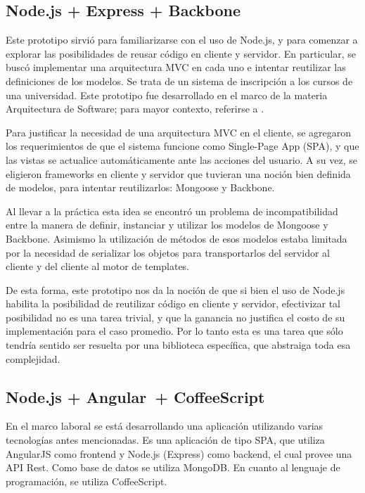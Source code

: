 \documentclass[doc,helv,longtable]{article}
\begin{document}
\subsection{Node.js + Express + Backbone}
Este prototipo\cite{arqrepo} sirvió para familiarizarse con el uso de Node.js, y para comenzar a explorar las posibilidades de reusar código en cliente y servidor. En particular, se buscó implementar una arquitectura MVC en cada uno e intentar reutilizar las definiciones de los modelos. Se trata de un sistema de inscripción a los cursos de una universidad. Este prototipo fue desarrollado en el marco de la materia Arquitectura de Software; para mayor contexto, referirse a \cite{arqdoc}.

Para justificar la necesidad de una arquitectura MVC en el cliente, se agregaron los requerimientos de que el sistema funcione como Single-Page App (SPA)\cite{spa}, y que las vistas se actualice automáticamente ante las acciones del usuario. A su vez, se eligieron frameworks en cliente y servidor que tuvieran una noción bien definida de modelos, para intentar reutilizarlos: Mongoose\cite{mongoose} y Backbone.

Al llevar a la práctica esta idea se encontró un problema de incompatibilidad entre la manera de definir, instanciar y utilizar los modelos de Mongoose y Backbone. Asimismo la utilización de métodos de esos modelos estaba limitada por la necesidad de serializar los objetos para transportarlos del servidor al cliente y del cliente al motor de templates.

De esta forma, este prototipo nos da la noción de que si bien el uso de Node.js habilita la posibilidad de reutilizar código en cliente y servidor, efectivizar tal posibilidad no es una tarea trivial, y que la ganancia no justifica el costo de su implementación para el caso promedio. Por lo tanto esta es una tarea que sólo tendría sentido ser resuelta por una biblioteca específica, que abstraiga toda esa complejidad.

\subsection{Node.js + Angular + CoffeeScript}
En el marco laboral se está desarrollando una aplicación\cite{acekia} utilizando varias tecnologías antes mencionadas. Es una aplicación de tipo SPA\cite{spa}, que utiliza AngularJS como frontend y Node.js (Express) como backend, el cual provee una API Rest. Como base de datos se utiliza MongoDB\cite{mongo}. En cuanto al lenguaje de programación, se utiliza CoffeeScript. 
\end{document}
